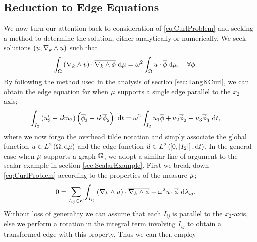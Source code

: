 \subsection{Reduction to Edge Equations}
We now turn our attention back to consideration of \eqref{eq:CurlProblem}  and seeking a method to determine the solution, either analytically or numerically.
We seek solutions $\left( u,\nabla_{k}\wedge u \right)$ such that
\begin{align*}
	\int_{\Omega}\left( \nabla_{k}\wedge u \right)\cdot\overline{\nabla_{k}\wedge\phi} \ \mathrm{d}\mu &= \omega^2\int_{\Omega}u\cdot\overline{\phi} \ \mathrm{d}\mu, \quad \forall\phi .
\end{align*}
By following the method used in the analysis of section \ref{sec:TangKCurl}, we can obtain the edge equation for when $\mu$ supports a single edge parallel to the $x_2$ axis;
\begin{align} \label{eq:OneEdge-EdgeEqn}
	\int_{I_2}\left( u_3^{\prime}-iku_2 \right)\left( \overline{\phi}_3^{\prime}+ik\overline{\phi}_2 \right) \ \mathrm{d}t &= \omega^2\int_{I_2}u_1\overline{\phi} + u_2\overline{\phi}_2 + u_3\overline{\phi}_3 \ \mathrm{d}t,
\end{align}
where we now forgo the overhead tilde notation and simply associate the global function $u\in L^{2}\left( \Omega,\mathrm{d}\mu \right)$ and the edge function $\widetilde{u}\in L^{2}\left( \left[ 0,\lvert I_2 \rvert \right],\mathrm{d}t \right)$.
In the general case when $\mu$ supports a graph $\mathbb{G}$, we adopt a similar line of argument to the scalar example in section \ref{sec:ScalarExample}.
First we break down \eqref{eq:CurlProblem} according to the properties of the measure $\mu$;
\begin{align*}
	0 &= \sum_{I_{ij}\in E} \int_{I_{ij}}\left( \nabla_{k}\wedge u \right)\cdot\overline{\nabla_{k}\wedge\phi}-\omega^2 u\cdot\overline{\phi} \ \mathrm{d}\lambda_{ij}.
\end{align*}
Without loss of generality we can assume that each $I_{ij}$ is parallel to the $x_2$-axis, else we perform a rotation in the integral term involving $I_{ij}$ to obtain a transformed edge with this property.
Thus we can then employ 

